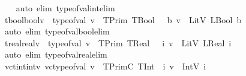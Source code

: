 \begin{isabellebody}
%
\isadelimproof
\ \ %
\endisadelimproof
%
\isatagproof
{}\isamarkupfalse%
\ {\isacharparenleft}{\kern0pt}auto\ elim{\isacharcolon}{\kern0pt}\ type{\isacharunderscore}{\kern0pt}of{\isacharunderscore}{\kern0pt}val{\isacharunderscore}{\kern0pt}int{\isacharunderscore}{\kern0pt}elim{\isacharparenright}{\kern0pt}%
\endisatagproof
{\isafoldproof}%
%
\isadelimproof
\isanewline
%
\endisadelimproof
\isanewline
{}\isamarkupfalse%
\ tbool{\isacharunderscore}{\kern0pt}boolv{\isacharcolon}{\kern0pt}\ {\isachardoublequoteopen}{\isasymlbrakk}\ type{\isacharunderscore}{\kern0pt}of{\isacharunderscore}{\kern0pt}val\ v\ {\isacharequal}{\kern0pt}\ TPrim\ TBool\ {\isasymrbrakk}\ {\isasymLongrightarrow}\ {\isasymexists}b{\isachardot}{\kern0pt}\ v\ {\isacharequal}{\kern0pt}\ LitV\ {\isacharparenleft}{\kern0pt}LBool\ b{\isacharparenright}{\kern0pt}{\isachardoublequoteclose}\isanewline
%
\isadelimproof
\ \ %
\endisadelimproof
%
\isatagproof
{}\isamarkupfalse%
\ {\isacharparenleft}{\kern0pt}auto\ elim{\isacharcolon}{\kern0pt}\ type{\isacharunderscore}{\kern0pt}of{\isacharunderscore}{\kern0pt}val{\isacharunderscore}{\kern0pt}bool{\isacharunderscore}{\kern0pt}elim{\isacharparenright}{\kern0pt}%
\endisatagproof
{\isafoldproof}%
%
\isadelimproof
\isanewline
%
\endisadelimproof
\isanewline
\isanewline
{}\isamarkupfalse%
\ treal{\isacharunderscore}{\kern0pt}realv{\isacharcolon}{\kern0pt}\ {\isachardoublequoteopen}{\isasymlbrakk}\ type{\isacharunderscore}{\kern0pt}of{\isacharunderscore}{\kern0pt}val\ v\ {\isacharequal}{\kern0pt}\ TPrim\ TReal\ {\isasymrbrakk}\ {\isasymLongrightarrow}\ {\isasymexists}i{\isachardot}{\kern0pt}\ v\ {\isacharequal}{\kern0pt}\ LitV\ {\isacharparenleft}{\kern0pt}LReal\ i{\isacharparenright}{\kern0pt}{\isachardoublequoteclose}\isanewline
%
\isadelimproof
\ \ %
\endisadelimproof
%
\isatagproof
{}\isamarkupfalse%
\ {\isacharparenleft}{\kern0pt}auto\ elim{\isacharcolon}{\kern0pt}\ type{\isacharunderscore}{\kern0pt}of{\isacharunderscore}{\kern0pt}val{\isacharunderscore}{\kern0pt}real{\isacharunderscore}{\kern0pt}elim{\isacharparenright}{\kern0pt}%
\endisatagproof
{\isafoldproof}%
%
\isadelimproof
\isanewline
%
\endisadelimproof
\isanewline
{}\isamarkupfalse%
\ vc{\isacharunderscore}{\kern0pt}tint{\isacharunderscore}{\kern0pt}intv{\isacharcolon}{\kern0pt}\ {\isachardoublequoteopen}vc{\isacharunderscore}{\kern0pt}type{\isacharunderscore}{\kern0pt}of{\isacharunderscore}{\kern0pt}val\ v\ {\isacharequal}{\kern0pt}\ TPrimC\ TInt\ {\isasymLongrightarrow}\ {\isasymexists}i{\isachardot}{\kern0pt}\ v\ {\isacharequal}{\kern0pt}\ IntV\ i{\isachardoublequoteclose}\isanewline

\end{isabellebody}
